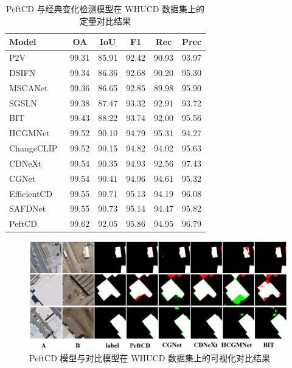 \begin{table}[!htbp]
\centering
\caption{PeftCD 与经典变化检测模型在 WHUCD 数据集上的定量对比结果}
\label{tab:peftcd_whucd}
\begin{tabular}{l c c c c c}
\toprule
\textbf{Model} & \textbf{OA} & \textbf{IoU} & \textbf{F1} & \textbf{Rec} & \textbf{Prec} \\
\midrule
P2V~\cite{lin_transition_2023} & 99.31 & 85.91 & 92.42 & 90.93 & 93.97 \\
DSIFN~\cite{Zhang2020ADS} & 99.34 & 86.36 & 92.68 & 90.20 & 95.30 \\
MSCANet~\cite{m_liu_cnn-transformer_2022} & 99.36 & 86.65 & 92.85 & 89.98 & 95.90 \\
SGSLN~\cite{zhao_exchanging_2023} & 99.38 & 87.47 & 93.32 & 92.91 & 93.72 \\
BIT~\cite{chen_remote_2022} & 99.43 & 88.22 & 93.74 & 92.00 & 95.56 \\
HCGMNet~\cite{Han2023HCGMNetAH} & 99.52 & 90.10 & 94.79 & 95.31 & 94.27 \\
ChangeCLIP~\cite{dong2024changeclip} & 99.52 & 90.15 & 94.82 & 94.02 & 95.63 \\
CDNeXt~\cite{wei_robust_2024} & 99.54 & 90.35 & 94.93 & 92.56 & 97.43 \\
CGNet~\cite{han_change_2023} & 99.54 & 90.41 & 94.96 & 94.61 & 95.32 \\
EfficientCD~\cite{dong_efficientcd_2024} & 99.55 & 90.71 & 95.13 & 94.19 & 96.08 \\
SAFDNet~\cite{Fu2025BeyondCD} & 99.55 & 90.73 & 95.14 & 94.47 & 95.82 \\
\midrule
PeftCD & 99.62 & 92.05 & 95.86 & 94.95 & 96.79 \\
\bottomrule
\end{tabular}
\end{table}

\begin{figure}[!htbp]
  \centering
  \includegraphics[width=\textwidth]{paper_figures/基于AI基础模型微调的变化检测模型研究/PeftCD/peftcd_whucd.png}
  \caption{PeftCD 模型与对比模型在 WHUCD 数据集上的可视化对比结果}
  \label{fig:peftcd_whucd}
\end{figure}



